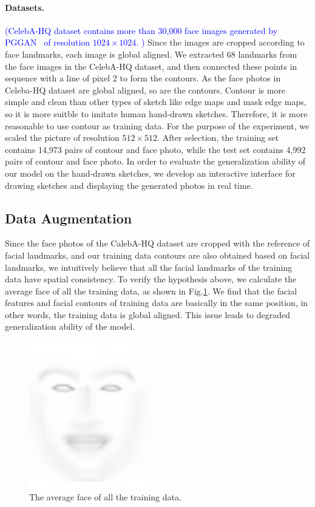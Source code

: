 \documentclass[10pt,twocolumn,letterpaper]{article}
\newcommand{\nt}[1]{\textcolor{blue}{(#1)}}
\begin{document}
\paragraph{Datasets.}
\nt{CelebA-HQ dataset contains more than 30,000 face images generated by PGGAN~\cite{pggan} of resolution $1024\times1024$. } Since the images are cropped according to face landmarks, each image is global aligned.
We extracted 68 landmarks from the face images in the CelebA-HQ dataset, and then connected these points in sequence with a line of pixel 2 to form the contours. 
As the face photos in Celeba-HQ dataset are global aligned, so are the contours. Contour is more simple and clean than other types of sketch like edge maps\cite{csagan} and mask edge maps\cite{maskgan}, so it is more suitble to imitate human hand-drawn sketches. 
Therefore, it is more reasonable to use contour as training data.
For the purpose of the experiment, we scaled the picture of resolution $512\times512$. 
After selection, the training set contains 14,973 pairs of contour and face photo, while the test set contains 4,992 pairs of contour and face photo. 
In order to evaluate the generalization ability of our model on the hand-drawn sketches, we develop an interactive interface for drawing sketches and displaying the generated photos in real time.

\subsection{Data Augmentation}\label{sec:augmentation} 
Since the face photos of the CalebA-HQ dataset are cropped with the reference of facial landmarks, and our training data contours are also obtained based on facial landmarks, we intuitively believe that all the facial landmarks of the training data have spatial consistency. 
To verify the hypothesis above, we calculate the average face of all the training data, as shown in Fig.\ref{fig:average_face}. 
We find that the facial features and facial contours of training data are basically in the same position, in other words, the training data is global aligned. 
This issue leads to degraded generalization ability of the model.
 
\begin{figure}[htb]
	\centering
	\includegraphics[width=0.18 \textwidth]{average_face.png}
	\caption{The average face of all the training data. }
	\label{fig:average_face}
\end{figure}
\end{document}
